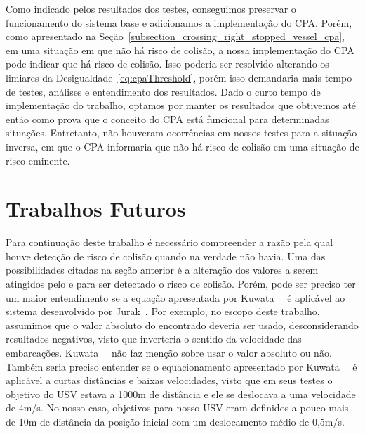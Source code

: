         Como indicado pelos resultados dos testes, conseguimos preservar o funcionamento do sistema base e adicionamos a implementação do CPA. Porém, como apresentado na Seção~\ref{subsection_crossing_right_stopped_vessel_cpa}, em uma situação em que não há risco de colisão, a nossa implementação do CPA pode indicar que há risco de colisão. Isso poderia ser resolvido alterando os limiares da Desigualdade~\ref{eq:cpaThreshold}, porém isso demandaria mais tempo de testes, análises e entendimento dos resultados. Dado o curto tempo de implementação do trabalho, optamos por manter os resultados que obtivemos até então como prova que o conceito do CPA está funcional para determinadas situações. Entretanto, não houveram ocorrências em nossos testes para a situação inversa, em que o CPA informaria que não há risco de colisão em uma situação de risco eminente. 
    
    \section{Trabalhos Futuros}
    
        Para continuação deste trabalho é necessário compreender a razão pela qual houve detecção de risco de colisão quando na verdade não havia. Uma das possibilidades citadas na seção anterior é a alteração dos valores a serem atingidos pelo \tcpa e \dcpa para ser detectado o risco de colisão. Porém, pode ser preciso ter um maior entendimento se a equação apresentada por Kuwata~\etal~\cite{Kuwata2014Safe} é aplicável ao sistema desenvolvido por Jurak~\cite{Jurak2020COLREGS}. Por exemplo, no escopo deste trabalho, assumimos que o valor absoluto do \tcpa encontrado deveria ser usado, desconsiderando resultados negativos, visto que inverteria o sentido da velocidade das embarcações. Kuwata~\etal~\cite{Kuwata2014Safe} 
        não faz menção sobre usar o valor absoluto ou não. Também seria preciso entender se o equacionamento apresentado por Kuwata~\etal~\cite{Kuwata2014Safe} é aplicável a curtas distâncias e baixas velocidades, visto que em seus testes o objetivo do USV estava a 1000m de distância e ele se deslocava a uma velocidade de 4m/s. No nosso caso, objetivos para nosso USV eram definidos a pouco mais de 10m de distância da posição inicial com um deslocamento médio de 0,5m/s.